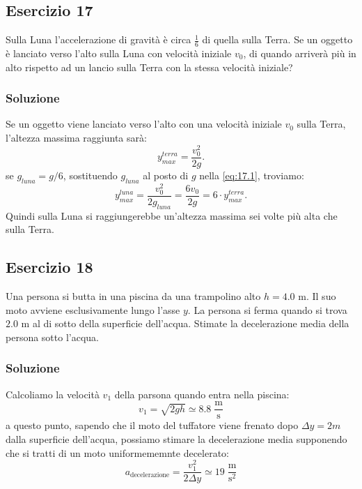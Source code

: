 \documentclass[12pt,a4paper]{book}
\begin{document}
\subsection*{Esercizio 17} 
Sulla Luna l'accelerazione di gravità è circa $\frac{1}{6}$ di quella sulla Terra. Se un oggetto è lanciato verso l'alto sulla Luna con velocità iniziale $v_0$, di quando arriverà più in alto rispetto ad un lancio sulla Terra con la stessa velocità iniziale?

\subsubsection*{Soluzione}
Se un oggetto viene lanciato verso l'alto con una velocità iniziale $v_{0}$ sulla Terra, l'altezza massima raggiunta sarà: 
\begin{equation}
y_{max}^{terra}=\frac{v_{0}^{2}}{2g}.
\label{eq:17.1}
\end{equation}
se $g_{luna}=g/6$, sostituendo $g_{luna}$ al posto di $g$ nella \ref{eq:17.1}, troviamo:
\begin{equation*}
y_{max}^{luna}=\frac{v_{0}^{2}}{2g_{luna}}=\frac{6v_{0}}{2g}=6\cdot y_{max}^{terra}.
\end{equation*}
Quindi sulla Luna si raggiungerebbe un'altezza massima sei volte più alta che sulla Terra.

\subsection*{Esercizio 18} 
Una persona si butta in una piscina da una trampolino alto $h=4.0$ m. Il suo moto avviene esclusivamente lungo l'asse $y$.
La persona si ferma quando si trova $2.0$ m al di sotto della superficie dell'acqua. Stimate la decelerazione media della persona sotto l'acqua.

\subsubsection*{Soluzione}
Calcoliamo la velocità $v_{1}$ della parsona quando entra nella piscina:
\begin{equation*}
v_{1}=\sqrt{2gh}\simeq 8.8 \;\frac{\text{m}}{\text{s}}
\end{equation*}
a questo punto, sapendo che il moto del tuffatore viene frenato dopo $\Delta y=2m$ dalla superficie dell'acqua, possiamo stimare la decelerazione media supponendo che si tratti di un moto uniformememnte decelerato:
\begin{equation*}
a_{\text{decelerazione}}=\frac{v_{1}^2}{2\Delta y}\simeq 19\; \frac{\text{m}}{\text{s}^2}
\end{equation*}
\end{document}
